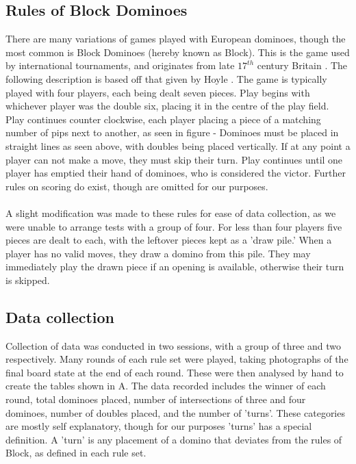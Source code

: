 \documentclass{article}
\begin{document}
\subsection{Rules of Block Dominoes}
There are many variations of games played with European dominoes, though the most common is Block Dominoes (hereby known as Block). This is the game used by international tournaments, and originates from late \(17^{th}\) century Britain \cite{Rules}. The following description is based off that given by Hoyle \cite{Rules}. The game is typically played with four players, each being dealt seven pieces. Play begins with whichever player was the double six, placing it in the centre of the play field. Play continues counter clockwise, each player placing a piece of a matching number of pips next to another, as seen in figure - %
Dominoes must be placed in straight lines as seen above, with doubles being placed vertically. If at any point a player can not make a move, they must skip their turn. Play continues until one player has emptied their hand of dominoes, who is considered the victor. Further rules on scoring do exist, though are omitted for our purposes. \\\\A slight modification was made to these rules for ease of data collection, as we were unable to arrange tests with a group of four. For less than four players five pieces are dealt to each, with the leftover pieces kept as a 'draw pile.' When a player has no valid moves, they draw a domino from this pile. They may immediately play the drawn piece if an opening is available, otherwise their turn is skipped.

\subsection{Data collection}
Collection of data was conducted in two sessions, with a group of three and two respectively. Many rounds of each rule set were played, taking photographs of the final board state at the end of each round. These were then analysed by hand to create the tables shown in A. The data recorded includes the winner of each round, total dominoes placed, number of intersections of three and four dominoes, number of doubles placed, and the number of 'turns'. These categories are mostly self explanatory, though for our purposes 'turns' has a special definition. A 'turn' is any placement of a domino that deviates from the rules of Block, as defined in each rule set.
\end{document}
